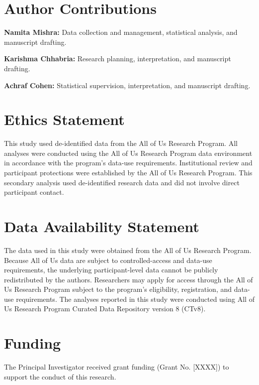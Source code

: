 \documentclass[11pt]{article}
\begin{document}
\section*{Author Contributions}

\textbf{Namita Mishra:} Data collection and management, statistical analysis, and manuscript drafting.

\textbf{Karishma Chhabria:} Research planning, interpretation, and manuscript drafting.

\textbf{Achraf Cohen:} Statistical supervision, interpretation, and manuscript drafting.

\section*{Ethics Statement}

This study used de-identified data from the All of Us Research Program.
All analyses were conducted using the All of Us Research Program data
environment in accordance with the program's data-use requirements.
Institutional review and participant protections were established by the
All of Us Research Program. This secondary analysis used de-identified
research data and did not involve direct participant contact.


\section*{Data Availability Statement}

The data used in this study were obtained from the All of Us Research Program.
Because All of Us data are subject to controlled-access and data-use
requirements, the underlying participant-level data cannot be publicly
redistributed by the authors. Researchers may apply for access through the
All of Us Research Program subject to the program's eligibility,
registration, and data-use requirements. The analyses reported in this study
were conducted using All of Us Research Program Curated Data Repository
version 8 (CTv8).
\section*{Funding}
The Principal Investigator received grant funding (Grant No. [XXXX]) to support the conduct of this research.
\end{document}

